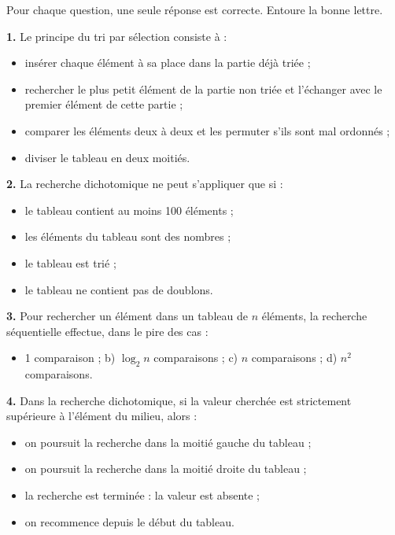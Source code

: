 \documentclass[11pt]{article}
\begin{document}
\begin{exercice}
Pour chaque question, une seule réponse est correcte. Entoure la bonne lettre.

\textbf{1.} Le principe du tri par sélection consiste à :
\begin{itemize}
\item[a)] insérer chaque élément à sa place dans la partie déjà triée ;
\item[b)] rechercher le plus petit élément de la partie non triée et l'échanger avec le premier élément de cette partie ;
\item[c)] comparer les éléments deux à deux et les permuter s'ils sont mal ordonnés ;
\item[d)] diviser le tableau en deux moitiés.
\end{itemize}

\textbf{2.} La recherche dichotomique ne peut s'appliquer que si :
\begin{itemize}
\item[a)] le tableau contient au moins 100 éléments ;
\item[b)] les éléments du tableau sont des nombres ;
\item[c)] le tableau est trié ;
\item[d)] le tableau ne contient pas de doublons.
\end{itemize}

\textbf{3.} Pour rechercher un élément dans un tableau de $n$ éléments, la recherche séquentielle effectue, dans le pire des cas :
\begin{itemize}
\item[a)] 1 comparaison ; \quad b) $\log_2 n$ comparaisons ; \quad c) $n$ comparaisons ; \quad d) $n^2$ comparaisons.
\end{itemize}

\textbf{4.} Dans la recherche dichotomique, si la valeur cherchée est strictement supérieure à l'élément du milieu, alors :
\begin{itemize}
\item[a)] on poursuit la recherche dans la moitié gauche du tableau ;
\item[b)] on poursuit la recherche dans la moitié droite du tableau ;
\item[c)] la recherche est terminée : la valeur est absente ;
\item[d)] on recommence depuis le début du tableau.
\end{itemize}
\end{exercice}
\end{document}
